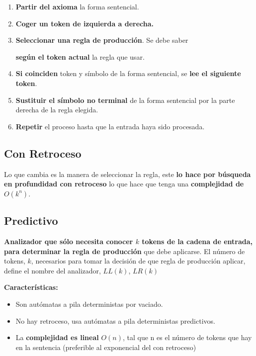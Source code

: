 \documentclass[12pt]{report} %
\begin{document}
\begin{enumerate}
\def\labelenumi{\arabic{enumi}.}

\item
  \textbf{Partir del axioma} la forma sentencial.
\item
  \textbf{Coger un token de izquierda a derecha.}
\item
  \textbf{Seleccionar una regla de producción}. Se debe saber
  
  \textbf{según el token actual} la regla que usar.
\item
  \textbf{Si coinciden} token y símbolo de la forma sentencial, se
  \textbf{lee el siguiente token}.
\item
  \textbf{Sustituir el símbolo no terminal} de la forma sentencial por
  la parte derecha de la regla elegida.
\item
  \textbf{Repetir} el proceso hasta que la entrada haya sido procesada.
\end{enumerate}


\subsection{Con Retroceso}

Lo que cambia es la manera de seleccionar la regla, este \textbf{lo hace
por búsqueda en profundidad con retroceso} lo que hace que tenga una
\textbf{complejidad de \(O(k^n)\)}.


\subsection{Predictivo}

\textbf{Analizador que sólo necesita conocer \(k\) tokens de la cadena
de entrada, para determinar la regla de producción} que debe aplicarse.
El número de tokens, \(k\), necesarios para tomar la decisión de que
regla de producción aplicar, define el nombre del analizador, \(LL(k)\),
\(LR(k)\)

\textbf{Características:}

\begin{itemize}

\item
  Son autómatas a pila deterministas por vaciado.
\item
  No hay retroceso, usa autómatas a pila deterministas predictivos.
\item
  La \textbf{complejidad es lineal} \(O(n)\), tal que n es el número de
  tokens que hay en la sentencia (preferible al exponencial del con
  retroceso)
\end{itemize}
\end{document}
